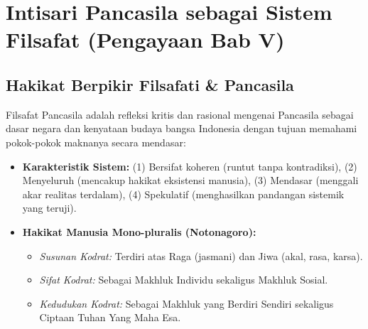 \documentclass[10pt,a4paper]{article}
\begin{document}
\section{Intisari Pancasila sebagai Sistem Filsafat (Pengayaan Bab V)}

\subsection{Hakikat Berpikir Filsafati \& Pancasila}
Filsafat Pancasila adalah refleksi kritis dan rasional mengenai Pancasila sebagai dasar negara dan kenyataan budaya bangsa Indonesia dengan tujuan memahami pokok-pokok maknanya secara mendasar:
\begin{itemize}
  \item \textbf{Karakteristik Sistem:} (1) Bersifat koheren (runtut tanpa kontradiksi), (2) Menyeluruh (mencakup hakikat eksistensi manusia), (3) Mendasar (menggali akar realitas terdalam), (4) Spekulatif (menghasilkan pandangan sistemik yang teruji).
  \item \textbf{Hakikat Manusia Mono-pluralis (Notonagoro):}
    \begin{itemize}
      \item \textit{Susunan Kodrat:} Terdiri atas Raga (jasmani) dan Jiwa (akal, rasa, karsa).
      \item \textit{Sifat Kodrat:} Sebagai Makhluk Individu sekaligus Makhluk Sosial.
      \item \textit{Kedudukan Kodrat:} Sebagai Makhluk yang Berdiri Sendiri sekaligus Ciptaan Tuhan Yang Maha Esa.
    \end{itemize}
\end{itemize}
\end{document}
